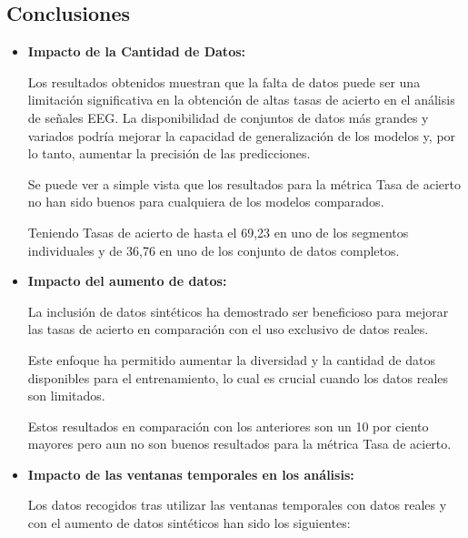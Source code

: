 
\subsection{Conclusiones}

\begin{itemize}
	
	\item
	\textbf{Impacto de la Cantidad de Datos:}
	
	Los resultados obtenidos muestran que la falta de datos puede ser una limitación significativa en la obtención de altas tasas de acierto en el análisis de señales EEG. La disponibilidad de conjuntos de datos más grandes y variados podría mejorar la capacidad de generalización de los modelos y, por lo tanto, aumentar la precisión de las predicciones.
	


	Se puede ver a simple vista que los resultados para la métrica Tasa de acierto no han sido buenos para cualquiera de los modelos comparados.

	Teniendo Tasas de acierto de hasta el 69,23 en uno de los segmentos individuales y de 36,76 en uno de los conjunto de datos completos.


	\item
	\textbf{Impacto del aumento de datos:}
	
	La inclusión de datos sintéticos ha demostrado ser beneficioso para mejorar las tasas de acierto en comparación con el uso exclusivo de datos reales. 
	
	Este enfoque ha permitido aumentar la diversidad y la cantidad de datos disponibles para el entrenamiento, lo cual es crucial cuando los datos reales son limitados.
	
	


	Estos resultados en comparación con los anteriores son un 10 por ciento mayores pero aun no son buenos resultados para la métrica Tasa de acierto.
	

	\item
	\textbf{Impacto de las ventanas temporales en los análisis:}
	
	Los datos recogidos tras utilizar las ventanas temporales con datos reales y con el aumento de datos sintéticos han sido los siguientes:
	

\end{itemize}
